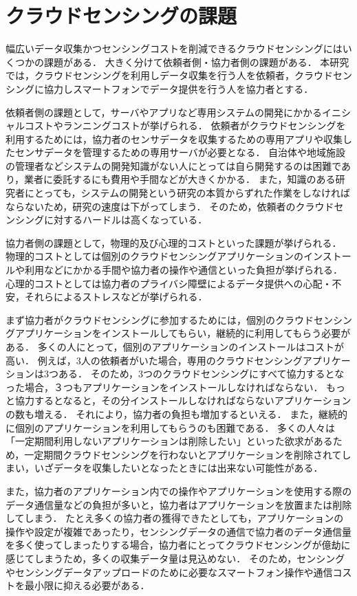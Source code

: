 \section{クラウドセンシングの課題}
\label{sec:abstract}
幅広いデータ収集かつセンシングコストを削減できるクラウドセンシングにはいくつかの課題がある．
大きく分けて依頼者側・協力者側の課題がある．
本研究では，クラウドセンシングを利用しデータ収集を行う人を依頼者，クラウドセンシングに協力しスマートフォンでデータ提供を行う人を協力者とする．

依頼者側の課題として，サーバやアプリなど専用システムの開発にかかるイニシャルコストやランニングコストが挙げられる．
依頼者がクラウドセンシングを利用するためには，協力者のセンサデータを収集するための専用アプリや収集したセンサデータを管理するための専用サーバが必要となる．
自治体や地域施設の管理者などシステムの開発知識がない人にとっては自ら開発するのは困難であり，業者に委託するにも費用や手間などが大きくかかる．
また，知識のある研究者にとっても，システムの開発という研究の本質からずれた作業をしなければならないため，研究の速度は下がってしまう．
そのため，依頼者のクラウドセンシングに対するハードルは高くなっている．

協力者側の課題として，物理的及び心理的コストといった課題が挙げられる．
物理的コストとしては個別のクラウドセンシングアプリケーションのインストールや利用などにかかる手間や協力者の操作や通信といった負担が挙げられる．
心理的コストとしては協力者のプライバシ障壁によるデータ提供への心配・不安，それらによるストレスなどが挙げられる．

まず協力者がクラウドセンシングに参加するためには，個別のクラウドセンシングアプリケーションをインストールしてもらい，継続的に利用してもらう必要がある．
多くの人にとって，個別のアプリケーションのインストールはコストが高い．
例えば，3人の依頼者がいた場合，専用のクラウドセンシングアプリケーションは3つある．
そのため，3つのクラウドセンシングにすべて協力するとなった場合，３つもアプリケーションをインストールしなければならない．
もっと協力するとなると，その分インストールしなければならないアプリケーションの数も増える．
それにより，協力者の負担も増加するといえる．
また，継続的に個別のアプリケーションを利用してもらうのも困難である．
多くの人々は「一定期間利用しないアプリケーションは削除したい」といった欲求があるため，一定期間クラウドセンシングを行わないとアプリケーションを削除されてしまい，いざデータを収集したいとなったときには出来ない可能性がある．

また，協力者のアプリケーション内での操作やアプリケーションを使用する際のデータ通信量などの負担が多いと，協力者はアプリケーションを放置または削除してしまう．
たとえ多くの協力者の獲得できたとしても，アプリケーションの操作や設定が複雑であったり，センシングデータの通信で協力者のデータ通信量を多く使ってしまったりする場合，協力者にとってクラウドセンシングが億劫に感じてしまうため，多くの収集データ量は見込めない．
そのため，センシングやセンシングデータアップロードのために必要なスマートフォン操作や通信コストを最小限に抑える必要がある．

